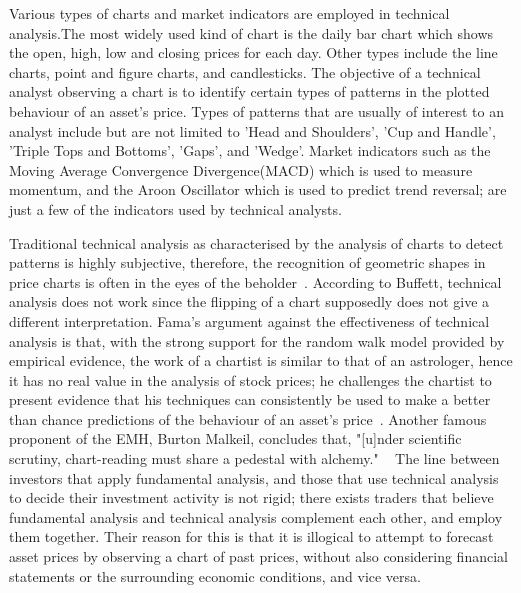 \documentclass[13pt]{report}
\begin{document}
Various types of charts and market indicators are employed in technical analysis.The most widely used kind of chart is the daily bar chart which shows the open, high, low and closing prices for each day. Other types include the line charts, point and figure charts, and candlesticks. The objective of a technical analyst observing a chart is to identify certain types of patterns in the plotted behaviour of an asset's price. Types of patterns that are usually of interest to an analyst include but are not limited to 'Head and Shoulders', 'Cup and Handle', 'Triple Tops and Bottoms', 'Gaps', and 'Wedge'. Market indicators such as the Moving Average Convergence Divergence(MACD) which is used to measure momentum, and the Aroon Oscillator which is used to predict trend reversal; are just a few of the indicators used by technical analysts.\par

Traditional technical analysis as characterised by the analysis of charts to detect patterns is highly subjective, therefore, the recognition of geometric shapes in price charts is often in the eyes of the beholder~\cite{lo2000foundations}. According to Buffett, technical analysis does not work since the flipping of a chart supposedly does not give a different interpretation. Fama's argument against the effectiveness of technical analysis is that, with the strong support for the random walk model provided by empirical evidence, the work of a chartist is similar to that of an astrologer, hence it has no real value in the analysis of stock prices; he  challenges the chartist to present evidence that his techniques can consistently be used to make a better than chance predictions of the behaviour of an asset's price~\cite{fama1995random}. Another famous proponent of the EMH, Burton Malkeil, concludes that, "[u]nder scientific scrutiny, chart-reading must share a pedestal with alchemy." ~\cite{lo2000foundations, malkiel1999random} The line between investors that apply fundamental analysis, and those that use technical analysis to decide their investment activity is not rigid; there exists traders that believe fundamental analysis and technical analysis complement each other, and employ them together. Their reason for this is that it is illogical to attempt to forecast asset prices by observing a chart of past prices, without also considering financial statements or the surrounding economic conditions, and vice versa.\par
\end{document}
